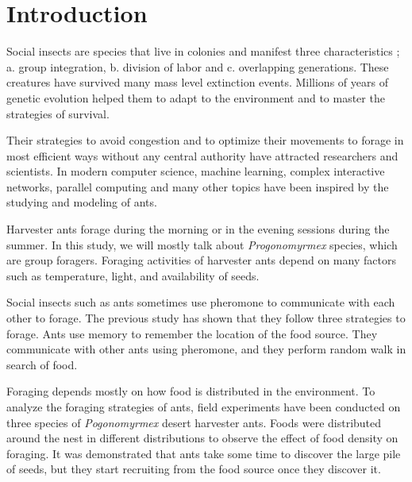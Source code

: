 \chapter{Introduction}
Social insects are  species that live in colonies and manifest three characteristics \cite{SocialInsect}; a. group integration\cite{anderson2001individual}, b. division of labor\cite{beshers2001models} and c. overlapping generations\cite{wilson2005eusociality}. These creatures have survived many mass level extinction events. Millions of years of genetic evolution helped them to adapt to the environment and to master the strategies of survival.  \par
Their strategies to avoid congestion and to optimize their movements to forage in most efficient ways without any central authority have attracted researchers and scientists\cite{narzt2010self}. In modern computer science, machine learning\cite{dorigo1997ant}, complex interactive networks\cite{he2011ant}, parallel computing\cite{bonabeau2000inspiration} and many other topics have been inspired by the studying and modeling of ants. \par
Harvester ants forage during the morning or in the evening sessions during the summer\cite{hobbs1985harvester, whitford1975factors}.  In this study, we will mostly talk about \textit{Progonomyrmex} species, which are group foragers\cite{whitford1978foraging}. Foraging activities of harvester ants depend on many factors such as temperature, light, and availability of seeds\cite{whitford1975factors}.\par 
Social insects such as ants sometimes use pheromone to communicate with each other to forage\cite{jackson2006communication}. The previous study has shown that they follow three strategies to forage\cite{flanagan2012quantifying,flanagan2011ants,letendre2013synergy}. Ants use memory to remember the location of the food source. They communicate with other ants using pheromone, and they perform random walk in search of food.\par 
Foraging depends mostly on how  food is distributed in the  environment\cite{traniello1989foraging,letendre2013synergy}. To analyze the foraging strategies of ants, field experiments have been conducted on three species of \textit{Pogonomyrmex} desert harvester ants. Foods were distributed around the nest in different distributions to observe the effect of food density on foraging. It was demonstrated that ants take some time to discover the large pile of seeds, but they start recruiting from the food source once they discover it\cite{flanagan2012quantifying}. 

